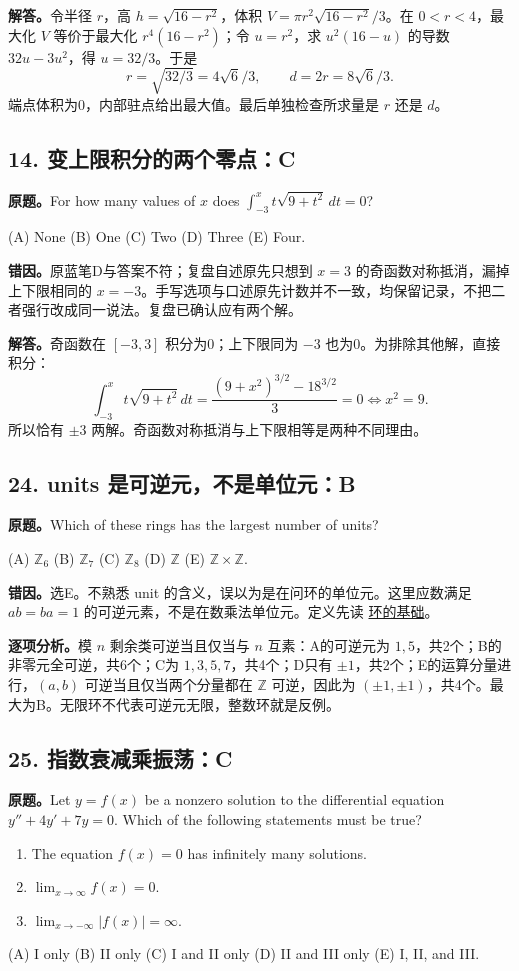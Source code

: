 \documentclass[11pt,a4paper,fontset=fandol]{ctexart}
\begin{document}
\textbf{解答。}令半径 $r$，高 $h=\sqrt{16-r^2}$，体积 $V=\pi r^2\sqrt{16-r^2}/3$。在 $0<r<4$，最大化 $V$ 等价于最大化 $r^4(16-r^2)$；令 $u=r^2$，求 $u^2(16-u)$ 的导数 $32u-3u^2$，得 $u=32/3$。于是
\[
r=\sqrt{32/3}=4\sqrt6/3,\qquad d=2r=\boxed{8\sqrt6/3}.
\]
端点体积为0，内部驻点给出最大值。最后单独检查所求量是 $r$ 还是 $d$。

\subsection{14. 变上限积分的两个零点：C}
\label{ms:q14}
\textbf{原题。}For how many values of $x$ does $\displaystyle\int_{-3}^x t\sqrt{9+t^2}\,dt=0$?

(A) None \quad (B) One \quad (C) Two \quad (D) Three \quad (E) Four.

\textbf{错因。}原蓝笔D与答案不符；复盘自述原先只想到 $x=3$ 的奇函数对称抵消，漏掉上下限相同的 $x=-3$。手写选项与口述原先计数并不一致，均保留记录，不把二者强行改成同一说法。复盘已确认应有两个解。

\textbf{解答。}奇函数在 $[-3,3]$ 积分为0；上下限同为 $-3$ 也为0。为排除其他解，直接积分：
\[
\int_{-3}^x t\sqrt{9+t^2}\,dt
=\frac{(9+x^2)^{3/2}-18^{3/2}}3=0
\iff x^2=9.
\]
所以恰有 $\pm3$ 两解。奇函数对称抵消与上下限相等是两种不同理由。

\subsection{24. units 是可逆元，不是单位元：B}
\label{ms:q24}
\textbf{原题。}Which of these rings has the largest number of units?

(A) $\mathbb Z_6$ \quad (B) $\mathbb Z_7$ \quad (C) $\mathbb Z_8$ \quad (D) $\mathbb Z$ \quad (E) $\mathbb Z\times\mathbb Z$.

\textbf{错因。}选E。不熟悉 unit 的含义，误以为是在问环的单位元。这里应数满足 $ab=ba=1$ 的可逆元素，不是在数乘法单位元。定义先读 \hyperref[review:rings]{环的基础}。

\textbf{逐项分析。}模 $n$ 剩余类可逆当且仅当与 $n$ 互素：A的可逆元为 $1,5$，共2个；B的非零元全可逆，共6个；C为 $1,3,5,7$，共4个；D只有 $\pm1$，共2个；E的运算分量进行，$(a,b)$ 可逆当且仅当两个分量都在 $\mathbb Z$ 可逆，因此为 $(\pm1,\pm1)$，共4个。最大为B。无限环不代表可逆元无限，整数环就是反例。

\subsection{25. 指数衰减乘振荡：C}
\label{ms:q25}
\textbf{原题。}Let $y=f(x)$ be a nonzero solution to the differential equation $y''+4y'+7y=0$. Which of the following statements must be true?
\begin{enumerate}[label=\Roman*.]
\item The equation $f(x)=0$ has infinitely many solutions.
\item $\displaystyle\lim_{x\to\infty}f(x)=0$.
\item $\displaystyle\lim_{x\to-\infty}|f(x)|=\infty$.
\end{enumerate}
(A) I only \quad (B) II only \quad (C) I and II only \quad (D) II and III only \quad (E) I, II, and III.
\end{document}
